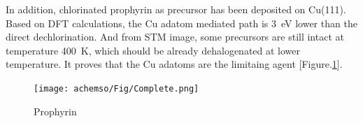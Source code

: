 \documentclass[journal=jacsat,manuscript=article]{achemso}
\begin{document}
In addition, chlorinated prophyrin as precursor has been deposited on Cu(111)\cite{chematerial2019}. Based on DFT calculations, the Cu adatom mediated path is 3~eV lower than the direct dechlorination. And from STM image, some precursors are still intact at temperature 400~K, which should be already dehalogenated at lower temperature. It proves that the Cu adatoms are the limitaing agent [Figure.\ref{fig:prophyrin}].
\begin{figure}[ht]
\centering
\texttt{[image: achemso/Fig/Complete.png]}
\caption{Prophyrin}
\label{fig:prophyrin}
\end{figure}






\end{document}
